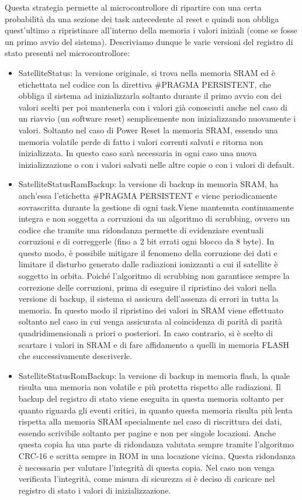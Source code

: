 \documentclass[LaM,binding=0.6cm,oneside]{../sapthesis}
\begin{document}
Questa strategia permette al microcontrollore di ripartire con una certa probabilità da una sezione dei task antecedente al reset e quindi non obbliga quest’ultimo a ripristinare all'interno della memoria i valori iniziali (come se fosse un primo avvio del sistema).
Descriviamo dunque le varie versioni del registro di stato presenti nel microcontrollore:
\begin{itemize}
    \item SatelliteStatus: la versione originale, si trova nella memoria SRAM ed è etichettata nel codice con la direttiva \#PRAGMA PERSISTENT, che obbliga il sistema ad inizializzarla soltanto durante il primo avvio con dei valori scelti per poi mantenerla con i valori già conosciuti anche nel caso di un riavvio (un software reset) semplicemente non inizializzando nuovamente i valori. 
    Soltanto nel caso di Power Reset la memoria SRAM, essendo una memoria volatile perde di fatto i valori correnti salvati e ritorna non inizializzata. In questo caso sarà necessaria in ogni caso una nuova inizializzazione o con i valori salvati nelle altre copie o con i valori di default.
    
    \item SatelliteStatusRamBackup: la versione di backup in memoria SRAM, ha anch’essa l’etichetta \#PRAGMA PERSISTENT e viene periodicamente sovrascritta durante la gestione di ogni task.Viene mantenuta continuamente integra e non soggetta a corruzioni da un algoritmo di scrubbing, ovvero un codice che tramite una ridondanza permette di evidenziare eventuali corruzioni e di correggerle (fino a 2 bit errati ogni blocco da 8 byte).
    In questo modo, è possibile mitigare il fenomeno della corruzione dei dati e limitare il disturbo generato dalle radiazioni ionizzanti a cui il satellite è soggetto in orbita.
    Poiché l’algoritmo di scrubbing non garantisce sempre la correzione delle corruzioni, prima di eseguire il ripristino dei valori nella versione di backup, il sistema si assicura dell'assenza di errori in tutta la memoria. In questo modo il ripristino dei valori in SRAM viene effettuato soltanto nel caso in cui venga assicurata al coincidenza di parità di parità quadridimensionali a priori o posteriori. In caso contrario, si è scelto di scartare i valori in SRAM e di fare affidamento a quelli in memoria FLASH che successivamente descriverle.
    
    \item SatelliteStatusRomBackup: la versione di backup in memoria flash, la quale risulta una memoria non volatile e più protetta rispetto alle radiazioni. 
Il backup del registro di stato viene eseguita in questa memoria soltanto per quanto riguarda gli eventi critici, in quanto questa memoria risulta più lenta rispetta alla memoria SRAM specialmente nel caso di riscrittura dei dati, essendo scrivibile soltanto per pagine e non per singole locazioni.
Anche questa copia ha una parte di ridondanza valutata sempre tramite l’algoritmo CRC-16 e scritta sempre in ROM in una locazione vicina. Questa ridondanza è necessaria per valutare l’integrità di questa copia. Nel caso non venga verificata l’integrità, come misura di sicurezza si è deciso di caricare nel registro di stato i valori di inizializzazione.
\end{itemize}
\end{document}
